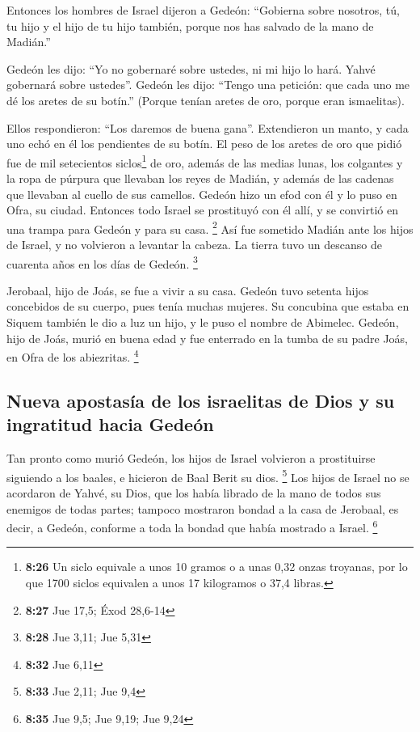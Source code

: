  Entonces los hombres de Israel dijeron a Gedeón:
``Gobierna sobre nosotros, tú, tu hijo y el hijo de tu hijo también,
porque nos has salvado de la mano de Madián.''

 Gedeón les dijo: ``Yo no gobernaré sobre ustedes, ni mi
hijo lo hará. Yahvé gobernará sobre ustedes''.  Gedeón
les dijo: ``Tengo una petición: que cada uno me dé los aretes de su
botín.'' (Porque tenían aretes de oro, porque eran ismaelitas).

 Ellos respondieron: ``Los daremos de buena gana''.
Extendieron un manto, y cada uno echó en él los pendientes de su botín.
 El peso de los aretes de oro que pidió fue de mil
setecientos siclos\footnote{\textbf{8:26} Un siclo equivale a unos 10
  gramos o a unas 0,32 onzas troyanas, por lo que 1700 siclos equivalen
  a unos 17 kilogramos o 37,4 libras.} de oro, además de las medias
lunas, los colgantes y la ropa de púrpura que llevaban los reyes de
Madián, y además de las cadenas que llevaban al cuello de sus camellos.
 Gedeón hizo un efod con él y lo puso en Ofra, su ciudad.
Entonces todo Israel se prostituyó con él allí, y se convirtió en una
trampa para Gedeón y para su casa. \footnote{\textbf{8:27} Jue 17,5;
  Éxod 28,6-14}  Así fue sometido Madián ante los hijos
de Israel, y no volvieron a levantar la cabeza. La tierra tuvo un
descanso de cuarenta años en los días de Gedeón. \footnote{\textbf{8:28}
  Jue 3,11; Jue 5,31}

 Jerobaal, hijo de Joás, se fue a vivir a su casa.
 Gedeón tuvo setenta hijos concebidos de su cuerpo, pues
tenía muchas mujeres.  Su concubina que estaba en Siquem
también le dio a luz un hijo, y le puso el nombre de Abimelec.
 Gedeón, hijo de Joás, murió en buena edad y fue
enterrado en la tumba de su padre Joás, en Ofra de los abiezritas.
\footnote{\textbf{8:32} Jue 6,11}

\hypertarget{nueva-apostasuxeda-de-los-israelitas-de-dios-y-su-ingratitud-hacia-gedeuxf3n}{%
\subsection{Nueva apostasía de los israelitas de Dios y su ingratitud
hacia
Gedeón}\label{nueva-apostasuxeda-de-los-israelitas-de-dios-y-su-ingratitud-hacia-gedeuxf3n}}

 Tan pronto como murió Gedeón, los hijos de Israel
volvieron a prostituirse siguiendo a los baales, e hicieron de Baal
Berit su dios. \footnote{\textbf{8:33} Jue 2,11; Jue 9,4}
 Los hijos de Israel no se acordaron de Yahvé, su Dios,
que los había librado de la mano de todos sus enemigos de todas partes;
 tampoco mostraron bondad a la casa de Jerobaal, es
decir, a Gedeón, conforme a toda la bondad que había mostrado a Israel.
\footnote{\textbf{8:35} Jue 9,5; Jue 9,19; Jue 9,24}


